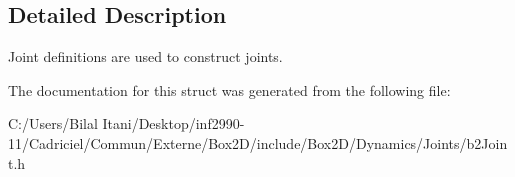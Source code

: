 \subsection{Detailed Description}
Joint definitions are used to construct joints. 

The documentation for this struct was generated from the following file\+:\begin{DoxyCompactItemize}
\item 
C\+:/\+Users/\+Bilal Itani/\+Desktop/inf2990-\/11/\+Cadriciel/\+Commun/\+Externe/\+Box2\+D/include/\+Box2\+D/\+Dynamics/\+Joints/b2\+Joint.\+h\end{DoxyCompactItemize}
